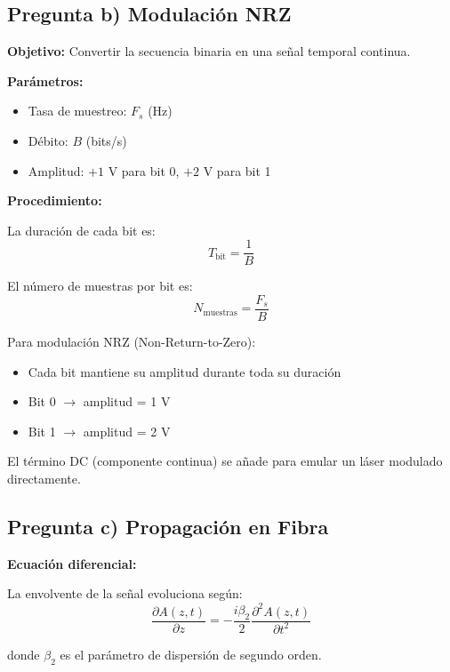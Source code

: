 \documentclass[11pt,a4paper]{article}
\begin{document}
\subsection{Pregunta b) Modulación NRZ}

\textbf{Objetivo:} Convertir la secuencia binaria en una señal temporal continua.

\textbf{Parámetros:}
\begin{itemize}
    \item Tasa de muestreo: $F_s$ (Hz)
    \item Débito: $B$ (bits/s)
    \item Amplitud: $+1$ V para bit 0, $+2$ V para bit 1
\end{itemize}

\textbf{Procedimiento:}

La duración de cada bit es:
\begin{equation}
    T_{\text{bit}} = \frac{1}{B}
\end{equation}

El número de muestras por bit es:
\begin{equation}
    N_{\text{muestras}} = \frac{F_s}{B}
\end{equation}

Para modulación NRZ (Non-Return-to-Zero):
\begin{itemize}
    \item Cada bit mantiene su amplitud durante toda su duración
    \item Bit 0 $\rightarrow$ amplitud = 1 V
    \item Bit 1 $\rightarrow$ amplitud = 2 V
\end{itemize}

El término DC (componente continua) se añade para emular un láser modulado directamente.

\subsection{Pregunta c) Propagación en Fibra}

\textbf{Ecuación diferencial:}

La envolvente de la señal evoluciona según:
\begin{equation}
    \frac{\partial A(z,t)}{\partial z} = -\frac{i\beta_2}{2}\frac{\partial^2 A(z,t)}{\partial t^2}
\end{equation}

donde $\beta_2$ es el parámetro de dispersión de segundo orden.
\end{document}
